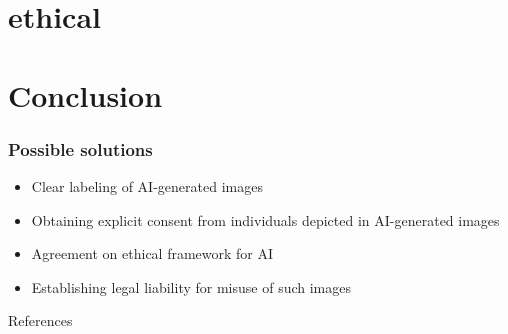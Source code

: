 \documentclass[
	11pt, compress%
]{beamer}
\begin{document}
\section{ethical}

\section{Conclusion}

\begin{frame}
	\frametitle{Possible solutions}
	\begin{itemize}
		\item Clear labeling of AI-generated images
		\item Obtaining explicit consent from individuals depicted in AI-generated images
		\item Agreement on ethical framework for AI
		\item Establishing legal liability for misuse of such images
	\end{itemize}
\end{frame}


\begin{frame}[plain]{References} 
    \nocite{*}
    
    
\end{frame}


\end{document}
